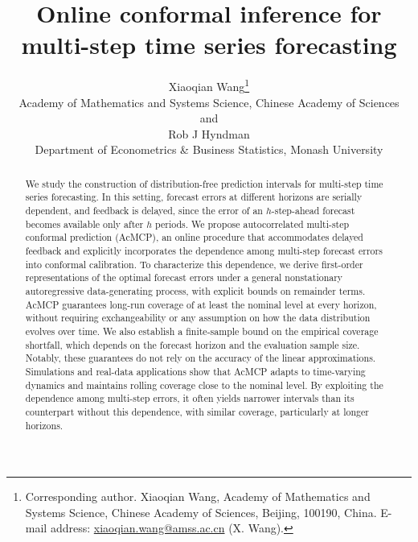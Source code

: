 \documentclass[
  american,
  12pt]{article}
\theoremstyle{plain}
\theoremstyle{plain}
\theoremstyle{remark}
\begin{document}
\def\spacingset#1{\renewcommand{\baselinestretch}%
{#1}\small\normalsize} \spacingset{1}

\renewcommand*{\arraystretch}{0.5} %


\title{\bf Online conformal inference for multi-step time series
forecasting}
\author{
Xiaoqian Wang\thanks{Corresponding author. Xiaoqian Wang, Academy of
Mathematics and Systems Science, Chinese Academy of Sciences, Beijing,
100190, China. E-mail address:
\href{mailto:xiaoqian.wang@amss.ac.cn}{xiaoqian.wang@amss.ac.cn} (X.
Wang).} \vspace{0.2em}\\
Academy of Mathematics and Systems Science, Chinese Academy of
Sciences \vspace{0.2em}\\
and \vspace{0.2em}\\Rob J Hyndman \vspace{0.2em}\\
Department of Econometrics \& Business Statistics, Monash
University \vspace{0.2em}\\
}
\maketitle

\bigskip
\bigskip
\begin{abstract}
We study the construction of distribution-free prediction intervals for
multi-step time series forecasting. In this setting, forecast errors at
different horizons are serially dependent, and feedback is delayed,
since the error of an \(h\)-step-ahead forecast becomes available only
after \(h\) periods. We propose autocorrelated multi-step conformal
prediction (AcMCP), an online procedure that accommodates delayed
feedback and explicitly incorporates the dependence among multi-step
forecast errors into conformal calibration. To characterize this
dependence, we derive first-order representations of the optimal
forecast errors under a general nonstationary autoregressive
data-generating process, with explicit bounds on remainder terms. AcMCP
guarantees long-run coverage of at least the nominal level at every
horizon, without requiring exchangeability or any assumption on how the
data distribution evolves over time. We also establish a finite-sample
bound on the empirical coverage shortfall, which depends on the forecast
horizon and the evaluation sample size. Notably, these guarantees do not
rely on the accuracy of the linear approximations. Simulations and
real-data applications show that AcMCP adapts to time-varying dynamics
and maintains rolling coverage close to the nominal level. By exploiting
the dependence among multi-step errors, it often yields narrower
intervals than its counterpart without this dependence, with similar
coverage, particularly at longer horizons.
\end{abstract}
\end{document}
